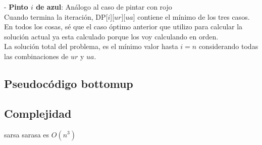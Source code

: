 - \textbf{Pinto $i$ de azul}:  Análogo al caso de pintar con rojo  \\

Cuando termina la iteración, DP[$i$][$ur$][$ua$] contiene el mínimo de los tres casos. En todos los cosas, sé que el caso óptimo anterior que utilizo para calcular la solución actual ya esta calculado porque los voy calculando en orden. \\

La solución total del problema, es el mínimo valor hasta $i = n$ considerando todas las combinaciones de $ur$ y $ua$.

\subsection{Pseudocódigo bottomup}


\subsection{Complejidad}

sarsa sarasa es $O(n^3)$